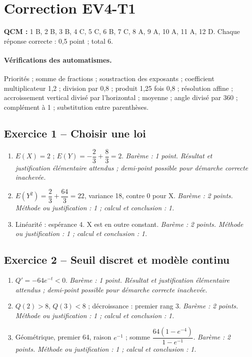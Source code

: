 \clearpage\section*{Correction EV4-T1}\label{EV4-T1-CORR}
\textbf{QCM :} 1 B, 2 B, 3 B, 4 C, 5 C, 6 B, 7 C, 8 A, 9 A, 10 A, 11 A, 12 D. Chaque réponse correcte : 0,5 point ; total 6.
\paragraph{Vérifications des automatismes.} Priorités ; somme de fractions ; soustraction des exposants ; coefficient multiplicateur 1,2 ; division par 0,8 ; produit 1,25 fois 0,8 ; résolution affine ; accroissement vertical divisé par l’horizontal ; moyenne ; angle divisé par 360 ; complément à 1 ; substitution entre parenthèses.
\subsection*{Exercice 1 -- Choisir une loi}
\begin{enumerate}
\item $E(X)=2$ ; $E(Y)=-\dfrac{2}{3}+\dfrac{8}{3}=2$. \textit{Barème : 1 point. Résultat et justification élémentaire attendus ; demi-point possible pour démarche correcte inachevée.}
\item $E(Y^2)=\dfrac{2}{3}+\dfrac{64}{3}=22$, variance 18, contre 0 pour X. \textit{Barème : 2 points. Méthode ou justification : 1 ; calcul et conclusion : 1.}
\item Linéarité : espérance 4. X est en outre constant. \textit{Barème : 2 points. Méthode ou justification : 1 ; calcul et conclusion : 1.}
\end{enumerate}
\subsection*{Exercice 2 -- Seuil discret et modèle continu}
\begin{enumerate}
\item $Q\prime=-64e^{-t}<0$. \textit{Barème : 1 point. Résultat et justification élémentaire attendus ; demi-point possible pour démarche correcte inachevée.}
\item $Q(2)>8$, $Q(3)<8$ ; décroissance : premier rang 3. \textit{Barème : 2 points. Méthode ou justification : 1 ; calcul et conclusion : 1.}
\item Géométrique, premier 64, raison $e^{-1}$ ; somme $\dfrac{64(1-e^{-4})}{1-e^{-1}}$. \textit{Barème : 2 points. Méthode ou justification : 1 ; calcul et conclusion : 1.}
\end{enumerate}
